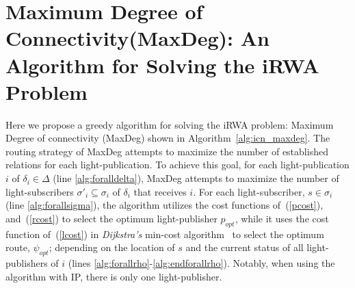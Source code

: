 \documentclass[journal]{IEEEtran}
\begin{document}
\section{Maximum Degree of Connectivity(MaxDeg): An Algorithm for Solving the iRWA Problem}\label{sec:alg}
Here we propose a greedy algorithm for solving the iRWA problem: Maximum Degree of connectivity (MaxDeg) shown in Algorithm~\ref{alg:icn_maxdeg}. The routing strategy of MaxDeg attempts to maximize the number of established relations for each light-publication.
To achieve this goal, for each light-publication $i$ of $\delta_i \in \Delta$ (line \ref{alg:foralldelta}), MaxDeg attempts to maximize the number of light-subscribers $\sigma'_i \subseteq \sigma_i$ of $\delta_i$ that receives $i$. For each light-subscriber, $s \in \sigma_i$ (line \ref{alg:forallsigma}),
 the algorithm utilizes the cost functions of~(\ref{pcost}),
 and~(\ref{rcost}) to select the optimum light-publisher $p_{opt}$,
 while it uses the cost function of~(\ref{lcost}) in \emph{Dijkstra's} min-cost algorithm~\cite{dij:rwa} to select the optimum route, $\psi_{opt}$; depending on the location of $s$ and the current status of all light-publishers of $i$ (lines \ref{alg:forallrho}-\ref{alg:endforallrho}).
Notably, when using the algorithm with IP, there is only one light-publisher.
 
\end{document}
